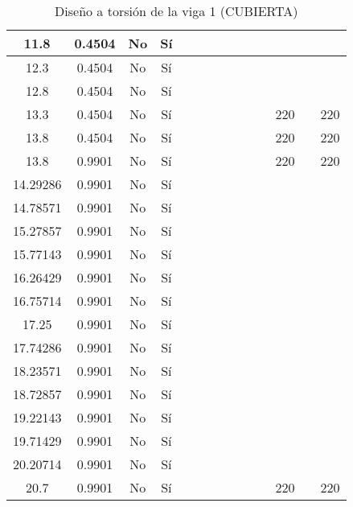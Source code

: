 \begin{table}[H]
{\begin{tabular}{|c|c|c|c|c|c|c|c|c|c|c|c|c|c|}
\hline
11.8 & 0.4504 & No  & Sí  &     &     &     &     &     &     &     &     &     &  \bigstrut\\
\hline
12.3 & 0.4504 & No  & Sí  &     &     &     &     &     &     &     &     &     &  \bigstrut\\
\hline
12.8 & 0.4504 & No  & Sí  &     &     &     &     &     &     &     &     &     &  \bigstrut\\
\hline
13.3 & 0.4504 & No  & Sí  &     &     &     &     &     &     &     & 220 &     & 220 \bigstrut\\
\hline
13.8 & 0.4504 & No  & Sí  &     &     &     &     &     &     &     & 220 &     & 220 \bigstrut\\
\hline
13.8 & 0.9901 & No  & Sí  &     &     &     &     &     &     &     & 220 &     & 220 \bigstrut\\
\hline
14.29286 & 0.9901 & No  & Sí  &     &     &     &     &     &     &     &     &     &  \bigstrut\\
\hline
14.78571 & 0.9901 & No  & Sí  &     &     &     &     &     &     &     &     &     &  \bigstrut\\
\hline
15.27857 & 0.9901 & No  & Sí  &     &     &     &     &     &     &     &     &     &  \bigstrut\\
\hline
15.77143 & 0.9901 & No  & Sí  &     &     &     &     &     &     &     &     &     &  \bigstrut\\
\hline
16.26429 & 0.9901 & No  & Sí  &     &     &     &     &     &     &     &     &     &  \bigstrut\\
\hline
16.75714 & 0.9901 & No  & Sí  &     &     &     &     &     &     &     &     &     &  \bigstrut\\
\hline
17.25 & 0.9901 & No  & Sí  &     &     &     &     &     &     &     &     &     &  \bigstrut\\
\hline
17.74286 & 0.9901 & No  & Sí  &     &     &     &     &     &     &     &     &     &  \bigstrut\\
\hline
18.23571 & 0.9901 & No  & Sí  &     &     &     &     &     &     &     &     &     &  \bigstrut\\
\hline
18.72857 & 0.9901 & No  & Sí  &     &     &     &     &     &     &     &     &     &  \bigstrut\\
\hline
19.22143 & 0.9901 & No  & Sí  &     &     &     &     &     &     &     &     &     &  \bigstrut\\
\hline
19.71429 & 0.9901 & No  & Sí  &     &     &     &     &     &     &     &     &     &  \bigstrut\\
\hline
20.20714 & 0.9901 & No  & Sí  &     &     &     &     &     &     &     &     &     &  \bigstrut\\
\hline
20.7 & 0.9901 & No  & Sí  &     &     &     &     &     &     &     & 220 &     & 220 \bigstrut\\
\hline
\end{tabular}%

  



  }
      \caption{Diseño a torsión de la viga 1 (CUBIERTA) }
  \label{tab:T VG1 CUB }%
\end{table}%
